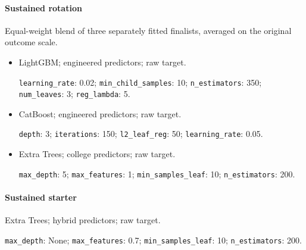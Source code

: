 \paragraph{Sustained rotation} Equal-weight blend of three separately fitted finalists, averaged on the original outcome scale.
\begin{itemize}\small\raggedright
\item LightGBM; engineered predictors; raw target.\par \texttt{learning\_rate}: 0.02; \texttt{min\_child\_samples}: 10; \texttt{n\_estimators}: 350; \texttt{num\_leaves}: 3; \texttt{reg\_lambda}: 5.
\item CatBoost; engineered predictors; raw target.\par \texttt{depth}: 3; \texttt{iterations}: 150; \texttt{l2\_leaf\_reg}: 50; \texttt{learning\_rate}: 0.05.
\item Extra Trees; college predictors; raw target.\par \texttt{max\_depth}: 5; \texttt{max\_features}: 1; \texttt{min\_samples\_leaf}: 10; \texttt{n\_estimators}: 200.
\end{itemize}
\paragraph{Sustained starter} Extra Trees; hybrid predictors; raw target.\par {\small\raggedright \texttt{max\_depth}: None; \texttt{max\_features}: 0.7; \texttt{min\_samples\_leaf}: 10; \texttt{n\_estimators}: 200.\par}
